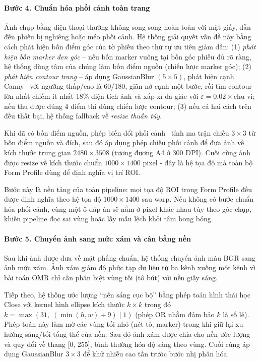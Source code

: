 \paragraph{Bước 4. Chuẩn hóa phối cảnh toàn trang}

Ảnh chụp bằng điện thoại thường không song song hoàn toàn với mặt giấy, dẫn đến phiếu bị nghiêng hoặc méo phối cảnh. Hệ thống giải quyết vấn đề này bằng cách phát hiện bốn điểm góc của tờ phiếu theo thứ tự ưu tiên giảm dần: (1) \textit{phát hiện bốn marker đen góc} -- nếu bốn marker vuông tại bốn góc phiếu đủ rõ ràng, hệ thống dùng tâm của chúng làm bốn điểm nguồn (chiến lược marker góc); (2) \textit{phát hiện contour trang} -- áp dụng GaussianBlur $(5\times5)$, phát hiện cạnh Canny~\cite{canny} với ngưỡng thấp/cao là 60/180, giãn nở cạnh một bước, rồi tìm contour lớn nhất chiếm ít nhất 18\% diện tích ảnh và xấp xỉ đa giác với $\varepsilon = 0.02 \times \text{chu vi}$; nếu thu được đúng 4 điểm thì dùng chiến lược contour; (3) nếu cả hai cách trên đều thất bại, hệ thống fallback về \textit{resize thuần túy}.

Khi đã có bốn điểm nguồn, phép biến đổi phối cảnh~\cite{gonzalez-dip} tính ma trận chiếu $3\times3$ từ bốn điểm nguồn và đích, sau đó áp dụng phép chiếu phối cảnh để đưa ảnh về kích thước trung gian $2480\times3508$ (tương đương A4 ở 300 DPI). Cuối cùng ảnh được resize về kích thước chuẩn $1000\times1400$ pixel - đây là hệ tọa độ mà toàn bộ Form Profile dùng để định nghĩa vị trí ROI.

Bước này là nền tảng của toàn pipeline: mọi tọa độ ROI trong Form Profile đều được định nghĩa theo hệ tọa độ $1000\times1400$ sau warp. Nếu không có bước chuẩn hóa phối cảnh, cùng một ô đáp án sẽ nằm ở pixel khác nhau tùy theo góc chụp, khiến pipeline đọc sai vùng hoặc lấy mẫu lệch khỏi tâm bong bóng.

\paragraph{Bước 5. Chuyển ảnh sang mức xám và cân bằng nền}

Sau khi ảnh được đưa về mặt phẳng chuẩn, hệ thống chuyển ảnh màu BGR sang ảnh mức xám. Ảnh xám giảm độ phức tạp dữ liệu từ ba kênh xuống một kênh vì bài toán OMR chỉ cần phân biệt vùng tối (tô bút) với nền giấy sáng.

Tiếp theo, hệ thống ước lượng ``nền sáng cục bộ'' bằng phép toán hình thái học~\cite{gonzalez-dip} Close với kernel hình ellipse kích thước $k\times k$ trong đó $k = \max(31,\; (\min(h,w) \div 9) \mathbin{|} 1)$ (phép OR nhằm đảm bảo $k$ là số lẻ). Phép toán này làm mờ các vùng tối nhỏ (nét tô, marker) trong khi giữ lại xu hướng sáng/tối tổng thể của nền. Sau đó ảnh xám được chia cho nền ước lượng và quy đổi về thang [0, 255], bình thường hóa độ sáng theo vùng. Cuối cùng áp dụng GaussianBlur $3\times3$ để khử nhiễu cao tần trước bước nhị phân hóa.

